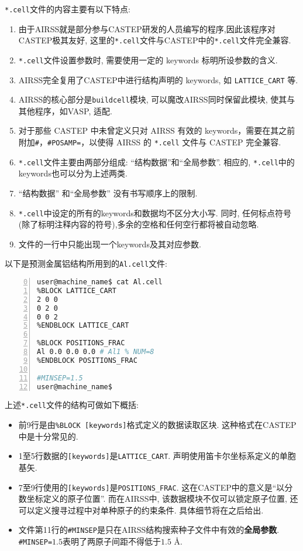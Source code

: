 \documentclass[a4paper, 10pt]{article}
\begin{document}
\verb|*.cell|文件的内容主要有以下特点:
\begin{enumerate}[(1)]
\item 由于AIRSS就是部分参与CASTEP研发的人员编写的程序,因此该程序对CASTEP极其友好, 这里的\verb|*.cell|文件与CASTEP中的\verb|*.cell|文件完全兼容.
\item \verb|*.cell|文件设置参数时, 需要使用一定的 keywords 标明所设参数的含义.
\item AIRSS完全复用了CASTEP中进行结构声明的 keywords, 如 \verb|LATTICE_CART| 等.
\item AIRSS的核心部分是\verb|buildcell|模块, 可以魔改AIRSS同时保留此模块, 使其与其他程序，如VASP, 适配.
\item 对于那些 CASTEP 中未曾定义只对 AIRSS 有效的 keywords，需要在其之前附加\verb|#|，\verb|#POSAMP=|，以使得 AIRSS 的 \verb|*.cell| 文件与 CASTEP 完全兼容.
\item \verb|*.cell|文件主要由两部分组成: ``结构数据''和``全局参数''. 相应的, \verb|*.cell|中的keywords也可以分为上述两类.
\item ``结构数据'' 和``全局参数'' 没有书写顺序上的限制.
\item \verb|*.cell|中设定的所有的keywords和数据均不区分大小写. 同时, 任何标点符号(除了标明注释内容的符号),多余的空格和任何空行都将被自动忽略.
\item 文件的一行中只能出现一个keywords及其对应参数.
\end{enumerate}

以下是预测金属铝结构所用到的\verb|Al.cell|文件:
\begin{lstlisting}[language={bash},numbers=left,firstnumber=0]
user@machine_name$ cat Al.cell
%BLOCK LATTICE_CART
2 0 0
0 2 0
0 0 2 
%ENDBLOCK LATTICE_CART

%BLOCK POSITIONS_FRAC
Al 0.0 0.0 0.0 # Al1 % NUM=8
%ENDBLOCK POSITIONS_FRAC

#MINSEP=1.5
user@machine_name$
\end{lstlisting}

上述\verb|*.cell|文件的结构可做如下概括:
\begin{itemize}
  \item 前9行是由\verb|%BLOCK [keywords]|格式定义的数据读取区块. 这种格式在CASTEP中是十分常见的.  
  \item 1至5行数据的\verb|[keywords]|是\verb|LATTICE_CART|. 声明使用笛卡尔坐标系定义的单胞基矢. 
  \item 7至9行使用的\verb|[keywords]|是\verb|POSITIONS_FRAC|. 这在CASTEP中的意义是``以分数坐标定义的原子位置''. 而在AIRSS中, 该数据模块不仅可以锁定原子位置, 还可以定义搜寻过程中对单种原子的约束条件. 具体细节将在之后给出. 
  \item 文件第11行的\verb|#MINSEP|是只在AIRSS结构搜索种子文件中有效的\textbf{全局参数}.
  \verb|#MINSEP=|\(1.5\)表明了两原子间距不得低于\(1.5\) \r{A}.
\end{itemize}
\end{document}
